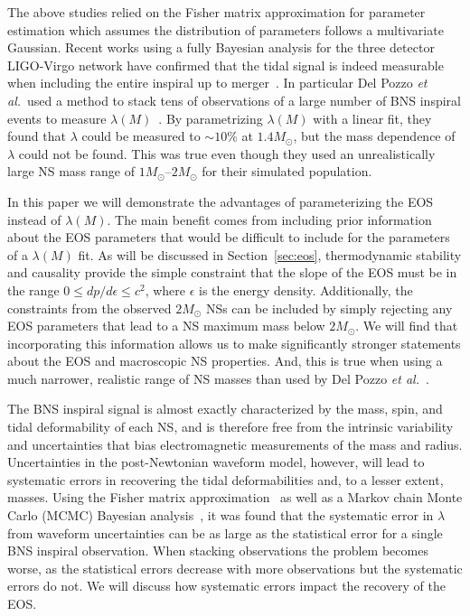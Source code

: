 \documentclass[twocolumn,prd,amssymb,aps,nofootinbib,showpacs,epsf]{revtex4}
\begin{document}
The above studies relied on the Fisher matrix approximation for parameter estimation which assumes the distribution of parameters follows a multivariate Gaussian. Recent works using a fully Bayesian analysis for the three detector LIGO-Virgo network have confirmed that the tidal signal is indeed measurable when including the entire inspiral up to merger~\cite{DelPozzoLiAgathos2013, WadeCreightonOchsner2014}. In particular Del Pozzo {\it et al.}\ used a method to stack tens of observations of a large number of BNS inspiral events to measure $\lambda(M)$~\cite{DelPozzoLiAgathos2013}. By parametrizing $\lambda(M)$ with a linear fit, they found that $\lambda$ could be measured to $\sim 10\%$ at $1.4M_\odot$, but the mass dependence of $\lambda$ could not be found. This was true even though they used an unrealistically large NS mass range of $1M_\odot$--$2M_\odot$ for their simulated population.

In this paper we will demonstrate the advantages of parameterizing the EOS instead of $\lambda(M)$. The main benefit comes from including prior information about the EOS parameters that would be difficult to include for the parameters of a $\lambda(M)$ fit. As will be discussed in Section~\ref{sec:eos}, thermodynamic stability and causality provide the simple constraint that the slope of the EOS must be in the range $0 \le dp/d\epsilon \le c^2$, where $\epsilon$ is the energy density. Additionally, the constraints from the observed $2M_\odot$ NSs can be included by simply rejecting any EOS parameters that lead to a NS maximum mass below $2M_\odot$. We will find that incorporating this information allows us to make significantly stronger statements about the EOS and macroscopic NS properties. And, this is true when using a much narrower, realistic range of NS masses than used by Del Pozzo {\it et al.}~\cite{DelPozzoLiAgathos2013}.

The BNS inspiral signal is almost exactly characterized by the mass, spin, and tidal deformability of each NS, and is therefore free from the intrinsic variability and uncertainties that bias electromagnetic measurements of the mass and radius. Uncertainties in the post-Newtonian waveform model, however, will lead to systematic errors in recovering the tidal deformabilities and, to a lesser extent, masses. Using the Fisher matrix approximation~\cite{Favata2014, YagiYunes2014} as well as a Markov chain Monte Carlo (MCMC) Bayesian analysis~\cite{WadeCreightonOchsner2014}, it was found that the systematic error in $\lambda$ from waveform uncertainties can be as large as the statistical error for a single BNS inspiral observation. When stacking observations the problem becomes worse, as the statistical errors decrease with more observations but the systematic errors do not. We will discuss how systematic errors impact the recovery of the EOS.
\end{document}
